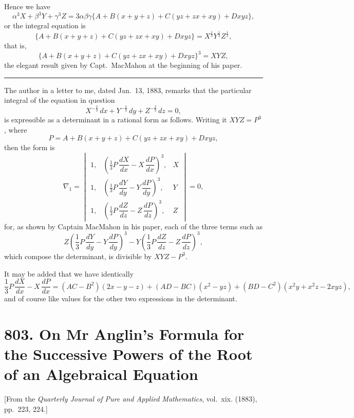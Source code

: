 \documentclass[11pt,a4paper]{book}
\begin{document}
Hence we have
\[
\alpha^3 X + \beta^3 Y + \gamma^3 Z
= 3\alpha\beta\gamma\{A + B(x+y+z) + C(yz+zx+xy) + Dxyz\},
\]
or the integral equation is
\[
\{A + B(x+y+z) + C(yz+zx+xy) + Dxyz\} = X^{\frac{1}{3}}Y^{\frac{1}{3}}Z^{\frac{1}{3}},
\]
that is,
\[
\{A + B(x+y+z) + C(yz+zx+xy) + Dxyz\}^3 = XYZ,
\]
the elegant result given by Capt.~MacMahon at the beginning of his paper.

\begin{center}
\rule{0.4\textwidth}{0.4pt}
\end{center}

The author in a letter to me, dated Jan.~13, 1883, remarks that the particular integral of the equation in question
\[
X^{-\frac{2}{3}}\,dx + Y^{-\frac{2}{3}}\,dy + Z^{-\frac{2}{3}}\,dz = 0,
\]
is expressible as a determinant in a rational form as follows. Writing it $XYZ = P^3$, where
\[
P = A + B(x+y+z) + C(yz+zx+xy) + Dxyz,
\]
then the form is
\[
\nabla_1 = \begin{vmatrix}
1, & \left(\frac{1}{3}P\,\dfrac{dX}{dx} - X\,\dfrac{dP}{dx}\right)^3, & X \\[1em]
1, & \left(\frac{1}{3}P\,\dfrac{dY}{dy} - Y\,\dfrac{dP}{dy}\right)^3, & Y \\[1em]
1, & \left(\frac{1}{3}P\,\dfrac{dZ}{dz} - Z\,\dfrac{dP}{dz}\right)^3, & Z
\end{vmatrix} = 0,
\]
for, as shown by Captain MacMahon in his paper, each of the three terms such as
\[
Z\left(\frac{1}{3}P\,\frac{dY}{dy} - Y\,\frac{dP}{dy}\right)^3
- Y\left(\frac{1}{3}P\,\frac{dZ}{dz} - Z\,\frac{dP}{dz}\right)^3,
\]
which compose the determinant, is divisible by $XYZ - P^3$.

It may be added that we have identically
\[
\frac{1}{3}P\,\frac{dX}{dx} - X\,\frac{dP}{dx}
= (AC-B^2)(2x-y-z) + (AD-BC)(x^2-yz) + (BD-C^2)(x^2y+x^2z-2xyz),
\]
and of course like values for the other two expressions in the determinant.


\newpage
\section*{803. On Mr Anglin's Formula for the Successive Powers of the Root of an Algebraical Equation}

\begin{center}
\small[From the \textit{Quarterly Journal of Pure and Applied Mathematics}, vol.~xix. (1883),\\
pp.~223, 224.]
\end{center}
\end{document}
